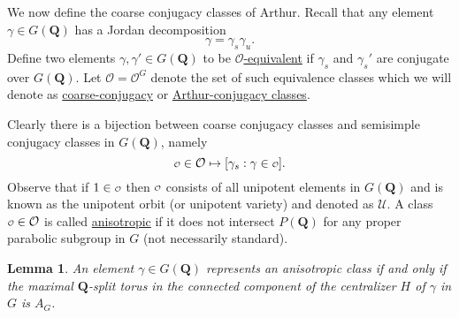 \documentclass[11pt]{amsart}
\def\Q{\mathbf Q}
\def\O{\mathcal O}
\def\o{\scalebox{0.8}{$\scriptstyle\mathcal{O}$}}
\def\UUU{\mathcal U}
\newtheorem{lemma}[theorem]{Lemma}
\theoremstyle{remark}
\begin{document}
We now define the coarse conjugacy classes of Arthur. Recall that any element $\gamma \in G(\Q)$ has a Jordan decomposition
\[ \gamma = \gamma_s \gamma_u. \]
Define two elements $\gamma, \gamma' \in G(\Q)$ to be \underline{$\O$-equivalent} if $\gamma_s$ and $\gamma_s'$ are conjugate over $G(\Q)$. Let $\O = \O^G$ denote the set of such equivalence classes which we will denote as \underline{coarse-conjugacy} or \underline{Arthur-conjugacy classes}. 

Clearly there is a bijection between coarse conjugacy classes and semisimple conjugacy classes in $G(\Q)$, namely 
\[ \o \in \O \mapsto [\gamma_s : \gamma \in \o ]. \]
Observe that if $1 \in \o$ then $\o$ consists of all unipotent elements in $G(\Q)$ and is known as the unipotent orbit (or unipotent variety) and denoted as $\UUU$. A class $\o \in \O$ is called \underline{anisotropic} if it does not intersect $P(\Q)$ for any proper parabolic subgroup in $G$ (not necessarily standard). 

\begin{lemma}
	An element $\gamma \in G(\Q)$ represents an anisotropic class if and only if the maximal $\Q$-split torus in the connected component of the centralizer $H$ of $\gamma$ in $G$ is $A_G$. 
\end{lemma}
\end{document}
